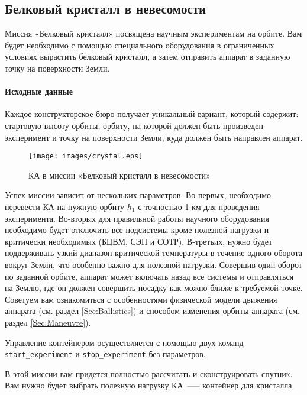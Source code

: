 \documentclass[12pt,a4paper]{article}
\begin{document}
\clearpage
\subsection{Белковый кристалл в невесомости}

Миссия «Белковый кристалл» посвящена научным экспериментам на орбите. Вам будет необходимо
с помощью специального оборудования в ограниченных условиях вырастить белковый кристалл,
а затем отправить аппарат в заданную точку на поверхности Земли.

\paragraph{Исходные данные}

Каждое конструкторское бюро получает уникальный вариант, который содержит: стартовую
высоту орбиты, орбиту, на которой должен быть произведен эксперимент и точку на
поверхности Земли, куда должен быть направлен аппарат.

\begin{figure}[tbh]
  \begin{center}
    \texttt{[image: images/crystal.eps]}
    \caption{КА в миссии «Белковый кристалл в невесомости»}
    \label{Pic:SMS}
  \end{center}
\end{figure}

Успех миссии зависит от нескольких параметров. Во-первых, необходимо перевести КА на
нужную орбиту $h_1$ с точностью 1 км для проведения эксперимента. Во-вторых для правильной
работы научного оборудования необходимо будет отключить все подсистемы кроме полезной
нагрузки и критически необходимых (БЦВМ, СЭП и СОТР). В-третьих, нужно будет поддерживать
узкий диапазон критической температуры в течение одного оборота вокруг Земли, что особенно
важно для полезной нагрузки. Совершив один оборот по заданной орбите, аппарат может
включать назад все системы и отправляться на Землю, где он должен совершить посадку как
можно ближе к требуемой точке. Советуем вам ознакомиться с особенностями физической модели
движения аппарата (см. раздел \ref{Sec:Ballistics}) и способом изменения орбиты аппарата
(см. раздел \ref{Sec:Maneuvre}).

Управление контейнером осуществляется с помощью двух команд \verb'start_experiment' и
\verb'stop_experiment' без параметров.

В этой миссии вам придется полностью рассчитать и сконструировать спутник. Вам нужно будет
выбрать полезную нагрузку КА~--— контейнер для кристалла.
\end{document}
